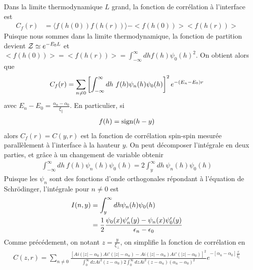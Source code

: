 Dans la limite thermodynamique $L$ grand, la fonction de corrélation  à l'interface est
\begin{align}
	C_f(r) &= \langle f(h(0))f(h(r))\rangle - <f(h(0))><f(h(r))>
\end{align}
Puisque nous sommes dans la limite thermodynamique, la fonction de partition devient $\mathcal{Z} \simeq e^{-E_0 L}$ et $<f(h(0))> = <f(h(r))> = \int_{-\infty}^\infty dh f(h) \psi_0(h)^2 $.
On obtient alors que
\begin{align}
	C_f(r) &=  \sum_{n\neq 0}\left[\int_{-\infty} ^\infty dh\  f(h)\psi_n(h)\psi_0(h)\right]^2 e^{-(E_n-E_0) r}  \nonumber \\
\end{align}
avec $E_n-E_0 = \frac{\alpha_n-\alpha_0}{\xi_\parallel}$. En particulier, si
\begin{align}
	f(h) = {\rm sign}(h-y)
\end{align}
alors $C_f(r)=C(y,r)$ est la fonction de corrélation spin-spin mesurée parallèlement à l'interface à la hauteur $y$. On peut décomposer l'intégrale en deux parties, et grâce à un changement de variable obtenir
\begin{align}
	\int_{-\infty} ^\infty dh\  f(h)\psi_n(h)\psi_0(h)=  2\int_y ^\infty dh\  \psi_n(h)\psi_0(h)
\end{align}
Puisque les $\psi_n$ sont des fonctions d'onde orthogonales répondant à l'équation de Schrödinger, l'intégrale pour $n\neq 0$ est
\begin{align}
	I(n,y)&= \int_y^\infty dh\psi_n(h)\psi_0(h)  \nonumber \\
	&= \frac{1}{2}\frac{\psi_0(x)\psi'_n(y) - \psi_n(x)\psi_0'(y)}{\epsilon_n-\epsilon_0}
\end{align} 
Comme précédement, on notant $z= \frac{y}{\xi_\perp}$, on simplifie la fonction de corrélation en
\begin{align}
	C(z ,r) = \sum_{n\neq 0} \frac{\left[ Ai(|z|-\alpha_0)Ai'(|z|-\alpha_n) -Ai(|z|-\alpha_n)Ai'(|z|-\alpha_0) \right]^2}
{ \int_0^\infty dz Ai^2 ( z-\alpha_0 )2 \int_0^\infty dz Ai^2 ( z-\alpha_n ) (\alpha_n-\alpha_0)^2}e^{-[\alpha_n-\alpha_0] \frac{r}{\xi_{||}}}
\end{align}

